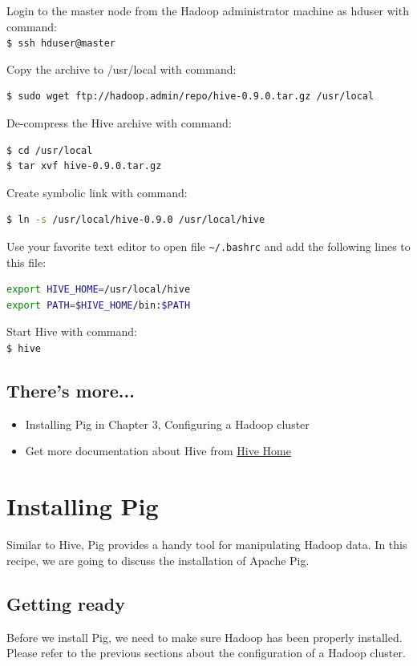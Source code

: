 Login to the master node from the Hadoop administrator machine as hduser with command: \\
\verb|$ ssh hduser@master|

Copy the archive to /usr/local with command:
\lstset{style=bashstyle}
\begin{lstlisting}[language=bash]
$ sudo wget ftp://hadoop.admin/repo/hive-0.9.0.tar.gz /usr/local
\end{lstlisting}

De-compress the Hive archive with command:
\lstset{style=bashstyle}
\begin{lstlisting}[language=bash]
$ cd /usr/local
$ tar xvf hive-0.9.0.tar.gz
\end{lstlisting}

Create symbolic link with command:
\lstset{style=bashstyle}
\begin{lstlisting}[language=bash]
$ ln -s /usr/local/hive-0.9.0 /usr/local/hive
\end{lstlisting}

Use your favorite text editor to open file \verb|~/.bashrc| and add the following lines to this file:
\lstset{style=bashstyle}
\begin{lstlisting}[language=bash]
export HIVE_HOME=/usr/local/hive
export PATH=$HIVE_HOME/bin:$PATH
\end{lstlisting}

Start Hive with command: \\
\verb|$ hive|
\subsection*{There's more...}
\begin{itemize}
  \item Installing Pig in Chapter 3, Configuring a Hadoop cluster
  \item Get more documentation about Hive from \href{https://cwiki.apache.org/confluence/display/Hive/Home}{Hive Home}
\end{itemize}

\section{Installing Pig}
Similar to Hive, Pig provides a handy tool for manipulating Hadoop data. In this recipe, we are going to discuss the installation of Apache Pig.
\subsection*{Getting ready}
Before we install Pig, we need to make sure Hadoop has been properly installed. Please refer to the previous sections about the configuration of a Hadoop cluster.

